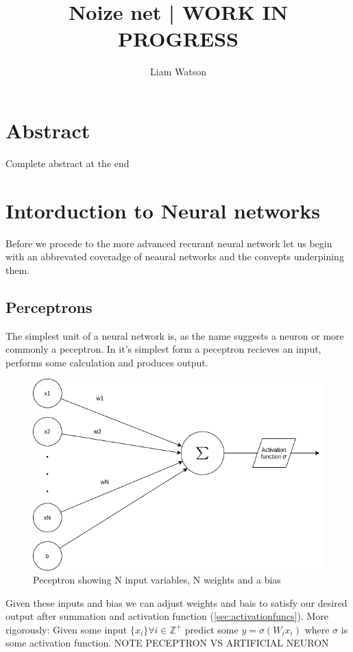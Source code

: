 \documentclass{article}
\title{Noize net | WORK IN PROGRESS}
\author{Liam Watson}
\begin{document}
\maketitle
\section{Abstract}
Complete abstract at the end
\section{Intorduction to Neural networks}
\label{sec:intro}
Before we procede to the more advanced recurant neural network let us begin with an abbrevated coveradge of neaural networks and the convepts underpining them. 
\subsection{Perceptrons}
\label{sec:peceptrons}
The simplest unit of a neural network is, as the name suggests a neuron or more commonly a peceptron. In it's simplest form a peceptron recieves an input, performs some calculation and produces output.
\begin{figure}[h]
\caption{Peceptron showing N input variables, N weights and a bias}
\includegraphics[scale=0.5]{peceptron.png}
\end{figure}
Given these inputs and bias we can adjust weights and bais to satisfy our desired output after summation and activation function (\ref{sec:activationfuncs}). 
More rigorously: Given some input $\{x_i\} \forall i\in \mathbb{Z^+}$ predict some $y=\sigma(W_i x_i)$ where $\sigma$ is some activation function. NOTE PECEPTRON VS ARTIFICIAL NEURON
\end{document}
